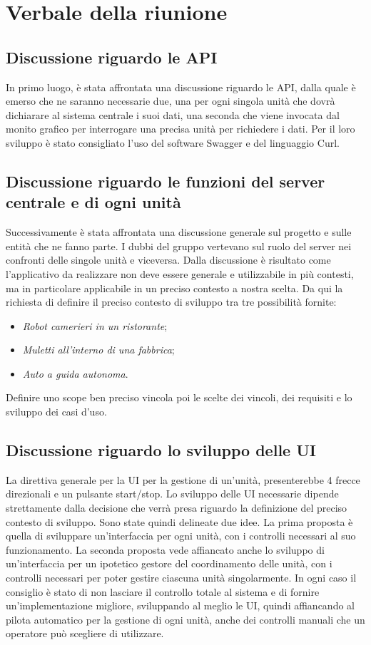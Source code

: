 \section{Verbale della riunione}

\subsection{Discussione riguardo le API}
In primo luogo, è stata affrontata una discussione riguardo le API, dalla quale è emerso che ne saranno necessarie due, una per ogni singola unità che dovrà dichiarare al sistema centrale i suoi dati, una seconda che viene invocata dal monito grafico per interrogare una precisa unità per richiedere i dati. Per il loro sviluppo è stato consigliato l'uso del software Swagger e del linguaggio Curl.

\subsection{Discussione riguardo le funzioni del server centrale e di ogni unità}
Successivamente è stata affrontata una discussione generale sul progetto e sulle entità che ne fanno parte. I dubbi del gruppo vertevano sul ruolo del server nei confronti delle singole unità e viceversa. Dalla discussione è risultato come l'applicativo da realizzare non deve essere generale e utilizzabile in più contesti, ma in particolare applicabile in un preciso contesto a nostra scelta. Da qui la richiesta di definire il preciso contesto di sviluppo tra tre possibilità fornite:
\begin{itemize}
	\item \textit{Robot camerieri in un ristorante};
	\item \textit{Muletti all'interno di una fabbrica};
	\item \textit{Auto a guida autonoma}.
\end{itemize}
Definire uno scope ben preciso vincola poi le scelte dei vincoli, dei requisiti e lo sviluppo dei casi d'uso.

\subsection{Discussione riguardo lo sviluppo delle UI} 
La direttiva generale per la UI per la gestione di un'unità, presenterebbe 4 frecce direzionali e un pulsante start/stop.
Lo sviluppo delle UI necessarie dipende strettamente dalla decisione che verrà presa riguardo la definizione del preciso contesto di sviluppo. Sono state quindi delineate due idee.
La prima proposta è quella di sviluppare un'interfaccia per ogni unità, con i controlli necessari al suo funzionamento. 
La seconda proposta vede affiancato anche lo sviluppo di un'interfaccia per un ipotetico gestore del coordinamento delle unità, con i controlli necessari per poter gestire ciascuna unità singolarmente.
In ogni caso il consiglio è stato di non lasciare il controllo totale al sistema e di fornire un'implementazione migliore, sviluppando al meglio le UI, quindi affiancando al pilota automatico per la gestione di ogni unità, anche dei controlli manuali che un operatore può scegliere di utilizzare. 
 
